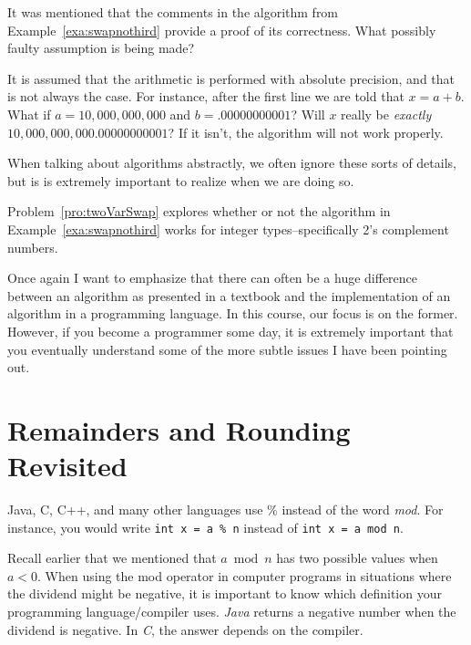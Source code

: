 \begin{exa}
It was mentioned that the comments in the algorithm from Example~\ref{exa:swapnothird}
provide a proof of its correctness.  What possibly faulty assumption is being made?
\begin{sol}
It is assumed that the arithmetic is performed with absolute precision, and that is 
not always the case.  
For instance, after the first line we are told that $x=a+b$.
What if $a=10,000,000,000$ and $b=.00000000001$?  Will $x$ really be {\em exactly} $10,000,000,000.00000000001$? If it isn't, the algorithm will not work properly. 

When talking about algorithms abstractly, we often ignore these
sorts of details, but is is extremely important to realize when we are
doing so.  
\end{sol}
\end{exa}

Problem~\ref{pro:twoVarSwap} explores whether or not the algorithm in Example~\ref{exa:swapnothird}
works for integer types--specifically 2's complement numbers.

Once again I want to emphasize that there can often be a huge 
difference between an algorithm as presented in a textbook and
the implementation of an algorithm in a programming language.
In this course, our focus is on the former. However, if you
become a programmer some day, it is extremely important
that you eventually understand some of the more subtle 
issues I have been pointing out.


\newpage

\section{Remainders and Rounding Revisited}\label{section:moddivRepeat}

Java, C, C++, and many other languages use $\%$ instead of the word {\em mod}.
For instance, you would write \verb+int x = a % n+ instead of \verb+int x = a mod n+.

\begin{rem}
Recall earlier that we mentioned that $a\bmod n$ has 
two possible values when $a<0$. 
When using the {\rm mod} operator in computer programs in situations where the
dividend might be negative, it is important to know which definition your
programming language/compiler uses.  {\em Java} returns a negative number when the dividend is negative. 
In {\em C}, the answer depends on the compiler.
\end{rem}

